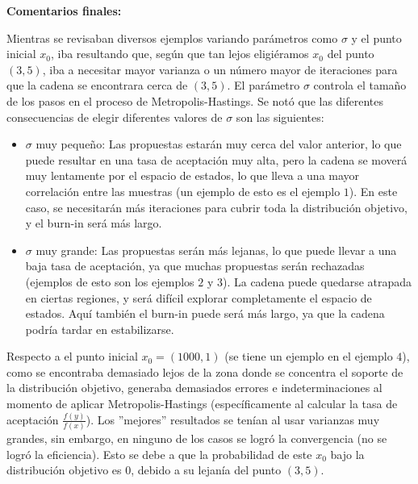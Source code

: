 \textbf{Comentarios finales:}

Mientras se revisaban diversos ejemplos variando parámetros como $\sigma$ y el punto inicial $x_0$, iba resultando que, según que tan lejos eligiéramos $x_0$ del punto $(3,5)$, iba a necesitar mayor varianza o un número mayor de iteraciones para que la cadena se encontrara cerca de $(3,5)$. El parámetro $\sigma$ controla el tamaño de los pasos en el proceso de Metropolis-Hastings. Se notó que las diferentes consecuencias de elegir diferentes valores de $\sigma$ son las siguientes:

\begin{itemize}
	\item $\sigma$ muy pequeño: Las propuestas estarán muy cerca del valor anterior, lo que puede resultar en una tasa de aceptación muy alta, pero la cadena se moverá muy lentamente por el espacio de estados, lo que lleva a una mayor correlación entre las muestras (un ejemplo de esto es el ejemplo $1$). En este caso, se necesitarán más iteraciones para cubrir toda la distribución objetivo, y el burn-in  será más largo.
	
	\item $\sigma$ muy grande: Las propuestas serán más lejanas, lo que puede llevar a una baja tasa de aceptación, ya que muchas propuestas serán rechazadas (ejemplos de esto son los ejemplos $2$ y $3$). La cadena puede quedarse atrapada en ciertas regiones, y será difícil explorar completamente el espacio de estados. Aquí también el burn-in puede será más largo, ya que la cadena podría tardar en estabilizarse.
\end{itemize}

Respecto a el punto inicial $x_0 = (1000,1)$ (se tiene un ejemplo en el ejemplo $4$), como se encontraba demasiado lejos de la zona donde se concentra el soporte de la distribución objetivo, generaba demasiados errores e indeterminaciones al momento de aplicar Metropolis-Hastings (específicamente al calcular la tasa de aceptación $\frac{f(y)}{f(x)}$). Los ''mejores'' resultados se tenían al usar varianzas muy grandes, sin embargo, en ninguno de los casos se logró la convergencia (no se logró la eficiencia). Esto se debe a que la probabilidad de este $x_0$ bajo la distribución objetivo es $0$, debido a su lejanía del punto $(3,5)$.


